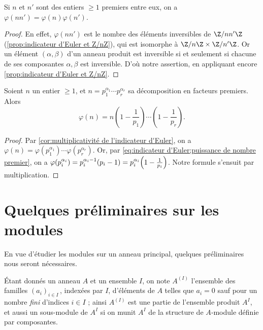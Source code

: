 \documentclass[11pt, %
  title in boldface,
  theorem in new line,
  theorem numbering = section,
  number theorems separately,
  simple name,
]{beaulivre}
\begin{document}
    \begin{corollary}\label{cor:multiplicativité de l'indicateur d'Euler}
        Si \( n \) et \( n' \) sont des entiers \( \geqslant 1 \) premiers entre eux, on a \( \varphi(nn') = \varphi(n)\varphi(n') \).
    \end{corollary}
    \begin{proof}
        En effet, \( \varphi(nn') \) est le nombre des éléments inversibles de \( \Z/nn'\Z \) (\cref{prop:indicateur d'Euler et Z/nZ}), qui est isomorphe à \( \Z/n\Z \times \Z/n'\Z \). Or un élément \( (\alpha,\beta) \) d'un anneau produit est inversible si et seulement si chacune de ses composantes \( \alpha,\beta \) est inversible. D'où notre assertion, en appliquant encore \cref{prop:indicateur d'Euler et Z/nZ}.
    \end{proof}

    \begin{corollary}
        Soient \( n \) un entier \( \geqslant 1 \), et \( n = p_1^{\alpha_1} \cdots p_r^{\alpha_r} \) sa décomposition en facteurs premiers. Alors
        \begin{equation}
            \varphi(n) = n \left(1 - \frac{1}{p_1}\right) \cdots \left(1 - \frac{1}{p_r}\right).
        \end{equation}
    \end{corollary}
    \begin{proof}
        Par \cref{cor:multiplicativité de l'indicateur d'Euler}, on a \( \varphi(n) = \varphi(p_1^{\alpha_1}) \cdots \varphi(p_r^{\alpha_r}) \). Or, par \eqref{eq:indicateur d'Euler;puissance de nombre premier}, on a \( \varphi(p_i^{\alpha_i}) = p_i^{\alpha_i-1}(p_i-1) = p_i^{\alpha_i} \Bigl(1-\frac{1}{p_i}\Bigr) \). Notre formule s'ensuit par multiplication.
    \end{proof}

\section{Quelques préliminaires sur les modules}\label{sec:quelques préliminaires sur les modules}

    En vue d'étudier les modules sur un anneau principal, quelques préliminaires nous seront nécessaires.

    Étant donnés un anneau \( A \) et un ensemble \( I \), on note \( A^{(I)} \) l'ensemble des familles \( (a_i)_{i \in I} \)\,, indexées par \( I \), d'éléments de \( A \) telles que \( a_i = 0 \) sauf pour un nombre \emph{fini} d'indices \( i \in I \) ;  ainsi \( A^{(I)} \) est une partie de l'ensemble produit \( A^I \), et aussi un sous-module de \( A^I \) si on munit \( A^I \) de la structure de \( A \)‑module définie par composantes.
\end{document}
